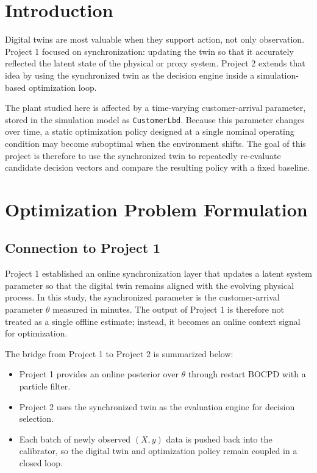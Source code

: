 \documentclass[11pt]{article}
\begin{document}
\section{Introduction}
Digital twins are most valuable when they support action, not only observation. Project 1 focused on synchronization: updating the twin so that it accurately reflected the latent state of the physical or proxy system. Project 2 extends that idea by using the synchronized twin as the decision engine inside a simulation-based optimization loop.

The plant studied here is affected by a time-varying customer-arrival parameter, stored in the simulation model as \texttt{CustomerLbd}. Because this parameter changes over time, a static optimization policy designed at a single nominal operating condition may become suboptimal when the environment shifts. The goal of this project is therefore to use the synchronized twin to repeatedly re-evaluate candidate decision vectors and compare the resulting policy with a fixed baseline.

\section{Optimization Problem Formulation}
\subsection{Connection to Project 1}
Project 1 established an online synchronization layer that updates a latent system parameter so that the digital twin remains aligned with the evolving physical process. In this study, the synchronized parameter is the customer-arrival parameter $\theta$ measured in minutes. The output of Project 1 is therefore not treated as a single offline estimate; instead, it becomes an online context signal for optimization.

The bridge from Project 1 to Project 2 is summarized below:
\begin{itemize}[leftmargin=1.5em]
    \item Project 1 provides an online posterior over $\theta$ through restart BOCPD with a particle filter.
    \item Project 2 uses the synchronized twin as the evaluation engine for decision selection.
    \item Each batch of newly observed \((X, y)\) data is pushed back into the calibrator, so the digital twin and optimization policy remain coupled in a closed loop.
\end{itemize}
\end{document}
